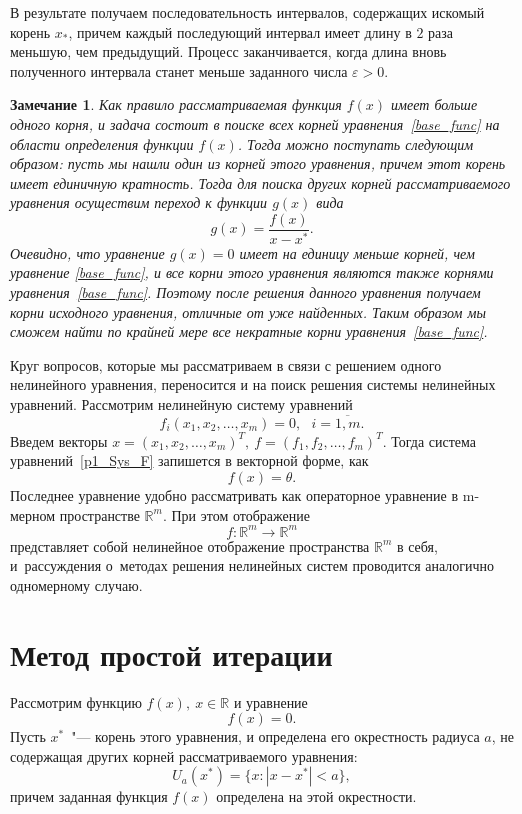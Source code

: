 \documentclass[11pt,a4paper,twoside,listtotoc,bibtotoc]{report}
\numberwithin{equation}{section}
\theoremstyle{definition}
\theoremstyle{plain}
\newtheorem*{note*}{Замечание}
\begin{document}
В результате получаем последовательность интервалов, содержащих искомый корень
$x_*$, причем каждый последующий интервал имеет длину в $2$ раза меньшую, чем
предыдущий. Процесс заканчивается, когда длина вновь полученного интервала станет
меньше заданного числа $\varepsilon > 0$.
%
\begin{note*}
%
Как правило рассматриваемая функция $f(x)$ имеет больше одного корня, и задача
состоит в поиске всех корней уравнения~\eqref{base_func} на области определения
функции $f(x)$. Тогда можно поступать следующим образом: пусть мы нашли один
из корней этого уравнения, причем этот корень имеет единичную
кратность. Тогда для поиска других корней рассматриваемого уравнения осуществим
переход к функции $g(x)$ вида
%
$$
    g(x)=\frac{f(x)}{x-x^*}.
$$
%
Очевидно, что уравнение $g(x)=0$ имеет на единицу меньше корней, чем уравнение
\eqref{base_func}, и все корни этого уравнения являются также корнями
уравнения~\eqref{base_func}. Поэтому после решения данного уравнения получаем корни
исходного уравнения, отличные от уже найденных. Таким образом мы сможем найти
по крайней мере все некратные корни уравнения~\eqref{base_func}.
%
\end{note*}
%
Круг вопросов, которые мы рассматриваем в связи с решением одного
нелинейного уравнения, переносится и на поиск решения системы нелинейных
уравнений. Рассмотрим нелинейную систему уравнений
%
\begin{equation}
    f_i(x_1,x_2, \ldots, x_m) = 0, ~~~i=\overline{1,m}.
    \label{p1_Sys_F}
\end{equation}
%
Введем векторы
$
    x=(x_1,x_2, \ldots, x_m)^T,~
    f=(f_1,f_2,\ldots,f_m)^T.
$
Тогда система уравнений~\eqref{p1_Sys_F} запишется в векторной форме, как
%
$$
    f(x) = \theta.
$$
%
Последнее уравнение удобно рассматривать как операторное уравнение в m-мерном
пространстве $\mathbb{R}^m$. При этом отображение
%
$$
    f\colon\mathbb{R}^m\longrightarrow\mathbb{R}^m
$$
%
представляет собой нелинейное отображение пространства $\mathbb{R}^m$ в себя,
и~рассуждения о~методах решения нелинейных систем проводится
аналогично одномерному случаю.

\section{Метод простой итерации}
%
Рассмотрим функцию $f(x), ~x\in \mathbb{R}$ и уравнение
%
\begin{equation}
%
    \label{base_func2}
    f(x)=0.
%
\end{equation}
%
Пусть $x^*$~"--- корень этого уравнения, и определена его
окрестность радиуса $a$, не содержащая других корней рассматриваемого
уравнения:
%
$$
    U_a(x^*)=\{x:|x-x^*| < a\},
$$
%
причем заданная функция $f(x)$ определена на этой окрестности.
\end{document}
